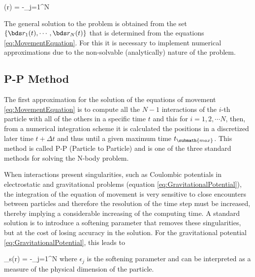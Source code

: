 { \phi(\bds r) = -\sum_{j=1}^N   }


The general solution to the problem is obtained from the set $\{ \bds 
r_1(t),\cdots, \bds r_N(t) \}$ that is determined from the equations
\ref{eq:MovementEquation}. For this it is necessary to implement numerical
approximations due to the non-solvable (analytically) nature of the 
problem.



	\subsection{P-P Method}
	\label{subsec:PPMethos}
	
	
The first approximation for the solution of the equations of movement
\ref{eq:MovementEquation} is to compute all the $N-1$ interactions of the
$i$-th particle with all of the others in a specific time $t$ and this for
$i=1,2,\cdots N$, then, from a numerical integration scheme it is 
calculated the positions in a discretized later time $t+\Delta t$ and thus
until a given maximum time $t_{\submath{max}}$. This method is called P-P 
(Particle to Particle) and is one of the three standard methods for 
solving the N-body problem.


When interactions present singularities, such as Coulombic potentials in
electrostatic and gravitational problems (equation 
\ref{eq:GravitationalPotential}), the integration of the equation of 
movement is very sensitive to close encounters between particles and 
therefore the resolution of the time step must be increased, thereby 
implying a considerable increasing of the computing time. A standard 
solution is to introduce a softening parameter that removes these 
singularities, but at the cost of losing accuracy in the solution. For the
gravitational potential \ref{eq:GravitationalPotential}, this leads to


{ \phi_{s}(\bds r) = -\sum_{j=1}^N   }
where $\epsilon_j$ is the softening parameter and can be interpreted as a
measure of the physical dimension of the particle.



